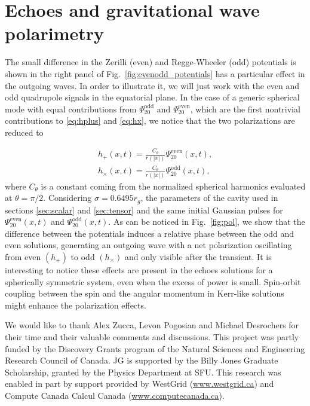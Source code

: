 \documentclass[article,aps,nofootinbib,twocolumn,superscriptaddress]{revtex4-1}
\begin{document}
\appendix
\section{Echoes and gravitational wave polarimetry}
\label{sec:AppendixPolar}


The small difference in the Zerilli (even) and Regge-Wheeler (odd) potentials is shown in the right panel of Fig.~\ref{fig:evenodd_potentials} has a particular effect in the outgoing waves. In order to illustrate it, we will just work with the even and odd quadrupole signals in the equatorial plane. In the case of a generic spherical mode with equal contributions from $\Psi^{\mathrm{odd}}_{20}$ and $\Psi^{\mathrm{even}}_{20} $, which are the first nontrivial contributions to \eqref{eq:hplus} and \eqref{eq:hx}, we notice that the two polarizations are reduced to

\begin{eqnarray}
h_+(x,t)=\frac{C_{\theta}}{r(|x|)}\Psi^{\mathrm{even}}_{20}(x,t),\nonumber\\
h_{\times}(x,t)=\frac{C_{\theta}}{r(|x|)}\Psi^{\mathrm{odd}}_{20}(x,t),\label{eq:pols}
\end{eqnarray}
where $C_{\theta}$ is a constant coming from the normalized spherical harmonics evaluated at $\theta=\pi/2$. Considering $\sigma=0.6495 r_g$, the parameters of the cavity used in sections \ref{sec:scalar} and \ref{sec:tensor} and the same initial Gaussian pulses for $\Psi^{\mathrm{even}}_{20}(x,t)$ and $\Psi^{\mathrm{odd}}_{20}(x,t)$.  As can be noticed in Fig.~\ref{fig:pol}, we show that the difference between the potentials induces a relative phase between the odd and even solutions, generating an outgoing wave with a net polarization oscillating from even $(h_+)$ to odd $(h_{\times})$ and only visible after the transient. It is interesting to notice these effects are present in the echoes solutions for a spherically symmetric system, even when the excess of power is small. Spin-orbit coupling between the spin and the angular momentum in Kerr-like solutions might enhance the polarization effects.
    
\begin{acknowledgments}
We would like to thank Alex Zucca, Levon Pogosian and Michael Desrochers for their time and their valuable comments and discussions. This project was partly funded by the Discovery Grants program of the Natural Sciences and Engineering Research Council of Canada. JG is supported by the Billy Jones Graduate Scholarship, granted by the Physics Department at SFU. This research was enabled in part by support provided by WestGrid (\url{www.westgrid.ca}) and Compute Canada Calcul Canada (\url{www.computecanada.ca}).
\end{acknowledgments}

\end{document}
